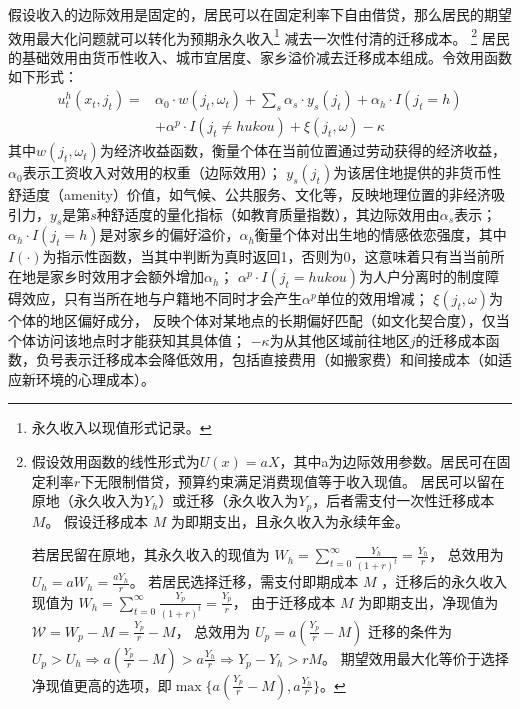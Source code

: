 \documentclass[a4paper,12pt,oneside]{book} %
\begin{document}
假设收入的边际效用是固定的，居民可以在固定利率下自由借贷，那么居民的期望效用最大化问题就可以转化为预期永久收入\footnote{永久收入以现值形式记录。}
减去一次性付清的迁移成本。
\footnote{
假设效用函数的线性形式为$U(x)=a X$，其中a为边际效用参数。居民可在固定利率$r$下无限制借贷，预算约束满足消费现值等于收入现值。
居民可以留在原地（永久收入为$Y_h$）或迁移（永久收入为$Y_p$，后者需支付一次性迁移成本 $M$。
假设迁移成本 
$M$
为即期支出，且永久收入为永续年金。

若居民留在原地，其永久收入的现值为
$W_h = \sum\limits_{t=0}^\infty \frac{Y_h}{(1+r)^t}=\frac{Y_h}{r}$，
总效用为$U_h=a W_h = \frac{a Y_h}{r}$。
若居民选择迁移，需支付即期成本 
$M$
，迁移后的永久收入现值为
$W_h = \sum\limits_{t=0}^\infty \frac{Y_p}{(1+r)^t}=\frac{Y_p}{r}$，
由于迁移成本 
$M$
为即期支出，净现值为
$\mathcal{W}=W_p-M=\frac{Y_p}{r}-M$，
总效用为
$U_p=a(\frac{Y_p}{r}-M)$
迁移的条件为$U_p>U_h \Rightarrow a(\frac{Y_p}{r}-M) > a \frac{ Y_h}{r} \Rightarrow Y_p-Y_h > rM$。
期望效用最大化等价于选择净现值更高的选项，即$\max\{a(\frac{Y_p}{r}-M), a \frac{ Y_h}{r}\}$。
}
居民的基础效用由货币性收入、城市宜居度、家乡溢价减去迁移成本组成。令效用函数如下形式：
\begin{equation}
  \begin{split}
    u_t^h(x_t,j_t)=&\alpha_0 \cdot w(j_t,\omega_t)+\sum\limits_{s} \alpha_{s} \cdot y_{s}(j_t)  + \alpha_h \cdot I(j_t=h) 
    \\& + \alpha^p \cdot I(j_t \neq hukou) +\xi(j_t,\omega)-\kappa
  \end{split}
  \label{eq:家乡效用函数中的具体构成}
\end{equation}
其中$w(j_t,\omega_t)$为经济收益函数，衡量个体在当前位置通过劳动获得的经济收益，$\alpha_0$表示工资收入对效用的权重（边际效用）；
$y_{s}(j_t)$为该居住地提供的非货币性舒适度（amenity）价值，如气候、公共服务、文化等，反映地理位置的非经济吸引力，$y_s$是第$s$种舒适度的量化指标（如教育质量指数），其边际效用由$\alpha_s$表示；
$\alpha_h \cdot I(j_t=h)$是对家乡的偏好溢价，$\alpha_h$衡量个体对出生地的情感依恋强度，其中$I(\cdot)$为指示性函数，当其中判断为真时返回1，否则为0，这意味着只有当当前所在地是家乡时效用才会额外增加$\alpha_h$；
$\alpha^p \cdot I(j_t = hukou)$为人户分离时的制度障碍效应，只有当所在地与户籍地不同时才会产生$\alpha^p$单位的效用增减；
$\xi(j_t,\omega)$为个体的地区偏好成分，
反映个体对某地点的长期偏好匹配（如文化契合度），仅当个体访问该地点时才能获知其具体值；
$-\kappa$为从其他区域前往地区$j$的迁移成本函数，负号表示迁移成本会降低效用，包括直接费用（如搬家费）和间接成本（如适应新环境的心理成本）。
\end{document}
